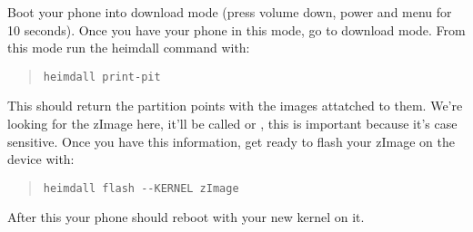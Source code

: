 \npar

Boot your phone into download mode (press volume down, power and menu for 10 seconds). Once you have your phone in this mode, go to download mode. From this mode run the heimdall command with:

\begin{quote} \begin{verbatim}heimdall print-pit \end{verbatim} \end{quote}

This should return the partition points with the images attatched to them. We're looking for the zImage here, it'll be called  or , this is important because it's case sensitive. Once you have this information, get ready to flash your zImage on the device with:

\begin{quote} \begin{verbatim}heimdall flash --KERNEL zImage \end{verbatim} \end{quote}

After this your phone should reboot with your new kernel on it.
